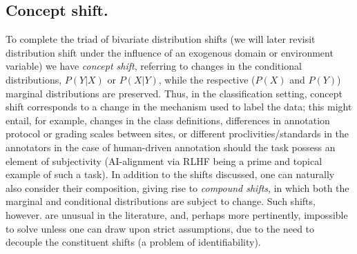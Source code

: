 \subsection{Concept shift.}\label{ssec:concept-shift}
%
To complete the triad of bivariate distribution shifts (we will later revisit distribution shift
under the influence of an exogenous domain or environment variable) we have \emph{concept shift},
referring to changes in the conditional distributions, \( P(Y|X) \) or \( P(X|Y) \), while the
respective (\( P(X) \) and \( P(Y) \)) marginal distributions are preserved.
%
Thus, in the classification setting, concept shift corresponds to a change in the mechanism used to
label the data; this might entail, for example, changes in the class definitions, differences in
annotation protocol or grading scales between sites,  or different proclivities/standards in the
annotators in the case of human-driven annotation should the task possess an element of
subjectivity (AI-alignment via RLHF \citep{bai2022training} being a prime and topical example of
such a task).
%
In addition to the shifts discussed, one can naturally also consider their composition, giving rise
to \emph{compound shifts}, in which both the marginal and conditional distributions are subject to
change. Such shifts, however. are unusual in the literature, and, perhaps more pertinently,
impossible to solve unless one can draw upon strict assumptions, due to the need to decouple the
constituent shifts (a problem of identifiability).
%

